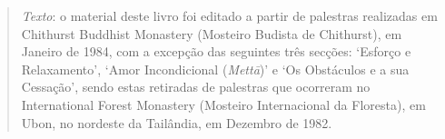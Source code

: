 \cleartorecto
\thispagestyle{empty}

\mbox{}\vfill

\begin{quote}
  \emph{Texto}: o material deste livro foi editado a partir de palestras realizadas
  em Chithurst Buddhist Monastery (Mosteiro Budista de Chithurst), em
  Janeiro de 1984, com a excepção das seguintes três secções: `Esforço e
  Relaxamento', `Amor Incondicional (\emph{Mettā})' e `Os Obstáculos e a sua
  Cessação', sendo estas retiradas de palestras que ocorreram no International
  Forest Monastery (Mosteiro Internacional da Floresta), em Ubon, no nordeste da
  Tailândia, em Dezembro de 1982.
\end{quote}

\vfill\mbox{}